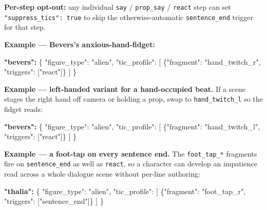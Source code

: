 \documentclass[
  11pt,
]{book}
\newenvironment{Shaded}{}{}
\newcommand{\DataTypeTok}[1]{\textcolor[rgb]{0.56,0.13,0.00}{#1}}
\newcommand{\ErrorTok}[1]{\textcolor[rgb]{1.00,0.00,0.00}{\textbf{#1}}}
\newcommand{\FunctionTok}[1]{\textcolor[rgb]{0.02,0.16,0.49}{#1}}
\newcommand{\OtherTok}[1]{\textcolor[rgb]{0.00,0.44,0.13}{#1}}
\newcommand{\StringTok}[1]{\textcolor[rgb]{0.25,0.44,0.63}{#1}}
\begin{document}
\textbf{Per-step opt-out:} any individual \texttt{say} /
\texttt{prop\_say} / \texttt{react} step can set
\texttt{"suppress\_tics":\ true} to skip the otherwise-automatic
\texttt{sentence\_end} trigger for that step.

\textbf{Example --- Bevers's anxious-hand-fidget:}

\begin{Shaded}
\begin{Highlighting}[]
\ErrorTok{"bevers":} \FunctionTok{\{}
  \DataTypeTok{"figure\_type"}\FunctionTok{:} \StringTok{"alien"}\FunctionTok{,}
  \DataTypeTok{"tic\_profile"}\FunctionTok{:} \OtherTok{[}
    \FunctionTok{\{}\DataTypeTok{"fragment"}\FunctionTok{:} \StringTok{"hand\_twitch\_r"}\FunctionTok{,} \DataTypeTok{"triggers"}\FunctionTok{:} \OtherTok{[}\StringTok{"react"}\OtherTok{]}\FunctionTok{\}}
  \OtherTok{]}
\FunctionTok{\}}
\end{Highlighting}
\end{Shaded}

\textbf{Example --- left-handed variant for a hand-occupied beat.}
If a scene stages the right hand off camera or holding a prop, swap
to \texttt{hand\_twitch\_l} so the fidget reads:

\begin{Shaded}
\begin{Highlighting}[]
\ErrorTok{"bevers":} \FunctionTok{\{}
  \DataTypeTok{"figure\_type"}\FunctionTok{:} \StringTok{"alien"}\FunctionTok{,}
  \DataTypeTok{"tic\_profile"}\FunctionTok{:} \OtherTok{[}
    \FunctionTok{\{}\DataTypeTok{"fragment"}\FunctionTok{:} \StringTok{"hand\_twitch\_l"}\FunctionTok{,} \DataTypeTok{"triggers"}\FunctionTok{:} \OtherTok{[}\StringTok{"react"}\OtherTok{]}\FunctionTok{\}}
  \OtherTok{]}
\FunctionTok{\}}
\end{Highlighting}
\end{Shaded}

\textbf{Example --- a foot-tap on every sentence end.} The
\texttt{foot\_tap\_*} fragments fire on \texttt{sentence\_end} as well
as \texttt{react}, so a character can develop an impatience read across
a whole dialogue scene without per-line authoring:

\begin{Shaded}
\begin{Highlighting}[]
\ErrorTok{"thalia":} \FunctionTok{\{}
  \DataTypeTok{"figure\_type"}\FunctionTok{:} \StringTok{"alien"}\FunctionTok{,}
  \DataTypeTok{"tic\_profile"}\FunctionTok{:} \OtherTok{[}
    \FunctionTok{\{}\DataTypeTok{"fragment"}\FunctionTok{:} \StringTok{"foot\_tap\_r"}\FunctionTok{,} \DataTypeTok{"triggers"}\FunctionTok{:} \OtherTok{[}\StringTok{"sentence\_end"}\OtherTok{]}\FunctionTok{\}}
  \OtherTok{]}
\FunctionTok{\}}
\end{Highlighting}
\end{Shaded}
\end{document}

